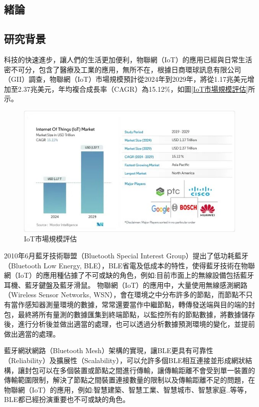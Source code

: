 \begin{ZhChapter}

\chapter{緒論}

\section{研究背景}

科技的快速進步，讓人們的生活更加便利，物聯網（IoT）的應用已經與日常生活密不可分，包含了醫療及工業的應用，無所不在，\cite{mordor2024iot}根據日商環球訊息有限公司（GII）調查，物聯網（IoT）市場規模預計從2024年到2029年，將從1.17兆美元增加至2.37兆美元，年均複合成長率（CAGR）為15.12\%，如圖\ref{IoT市場規模評估}所示。

\begin{figure}[htbp]
    \centering
    \includegraphics[width = 1\textwidth]{image/market_research.jpg}
    \caption{IoT市場規模評估\cite{mordor2024iot}}
    \label{fig: IoT市場規模評估}
\end{figure}

2010年6月藍牙技術聯盟（Bluetooth Special Interest Group）提出了低功耗藍牙（Bluetooth Low Energy, BLE），BLE省電及低成本的特性，使得藍牙技術在物聯網（IoT）的應用種佔據了不可或缺的角色，例如:目前市面上的無線設備包括藍牙耳機、藍牙鍵盤及藍牙滑鼠。
物聯網（IoT）的應用中，大量使用無線感測網路（Wireless Sensor Networks, WSN），會在環境之中分布許多的節點，而節點不只有當作感知器測量環境的數據，常常還要當作中繼節點，轉傳發送端與目的端的封包，最終將所有量測的數據匯集到終端節點，以監控所有的節點數據，將數據儲存後，進行分析後並做出適當的處理，也可以透過分析數據預測環境的變化，並提前做出適當的處理。

藍牙網狀網路（Bluetooth Mesh）架構的實現，讓BLE更具有可靠性（Reliability）及擴展性（Scalability），可以允許多個BLE相互連接並形成網狀結構，讓封包可以在多個裝置或節點之間進行傳輸，讓傳輸距離不會受到單一裝置的傳輸範圍限制，解決了節點之間裝置連接數量的限制以及傳輸距離不足的問題，在物聯網（IoT）的應用，例如:智慧建築、智慧工業、智慧城市、智慧家庭..等等，BLE都已經扮演重要也不可或缺的角色。
	

\end{ZhChapter}
